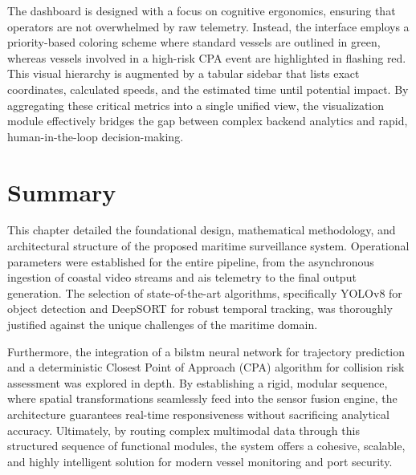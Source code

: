 The dashboard is designed with a focus on cognitive ergonomics, ensuring that operators are not overwhelmed by raw telemetry. Instead, the interface employs a priority-based coloring scheme where standard vessels are outlined in green, whereas vessels involved in a high-risk CPA event are highlighted in flashing red. This visual hierarchy is augmented by a tabular sidebar that lists exact coordinates, calculated speeds, and the estimated time until potential impact. By aggregating these critical metrics into a single unified view, the visualization module effectively bridges the gap between complex backend analytics and rapid, human-in-the-loop decision-making.

\section{Summary}
This chapter detailed the foundational design, mathematical methodology, and architectural structure of the proposed maritime surveillance system. Operational parameters were established for the entire pipeline, from the asynchronous ingestion of coastal video streams and \gls{ais} telemetry to the final output generation. The selection of state-of-the-art algorithms, specifically YOLOv8 for object detection and DeepSORT for robust temporal tracking, was thoroughly justified against the unique challenges of the maritime domain. 

Furthermore, the integration of a \gls{bilstm} neural network for trajectory prediction and a deterministic Closest Point of Approach (CPA) algorithm for collision risk assessment was explored in depth. By establishing a rigid, modular sequence, where spatial transformations seamlessly feed into the sensor fusion engine, the architecture guarantees real-time responsiveness without sacrificing analytical accuracy. Ultimately, by routing complex multimodal data through this structured sequence of functional modules, the system offers a cohesive, scalable, and highly intelligent solution for modern vessel monitoring and port security.
